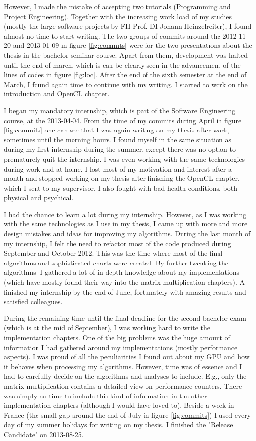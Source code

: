 However, I made the mistake of accepting two tutorials (Programming and Project Engineering). Together with the increasing work load of my studies (mostly the large software projects by FH-Prof. DI Johann Heinzelreiter), I found almost no time to start writing. The two groups of commits around the 2012-11-20 and 2013-01-09 in figure \ref{fig:commits} were for the two presentations about the thesis in the bachelor seminar course. Apart from them, development was halted until the end of march, which is can be clearly seen in the advancement of the lines of codes in figure \ref{fig:loc}. After the end of the sixth semester at the end of March, I found again time to continue with my writing. I started to work on the introduction and OpenCL chapter.

I began my mandatory internship, which is part of the Software Engineering course, at the 2013-04-04. From the time of my commits during April in figure \ref{fig:commits} one can see that I was again writing on my thesis after work, sometimes until the morning hours. I found myself in the same situation as during my first internship during the summer, except there was no option to prematurely quit the internship. I was even working with the same technologies during work and at home. I lost most of my motivation and interest after a month and stopped working on my thesis after finishing the OpenCL chapter, which I sent to my supervisor. I also fought with bad health conditions, both physical and psychical.

I had the chance to learn a lot during my internship. However, as I was working with the same technologies as I use in my thesis, I came up with more and more design mistakes and ideas for improving my algorithms. During the last month of my internship, I felt the need to refactor most of the code produced during September and October 2012. This was the time where most of the final algorithms and sophisticated charts were created. By further tweaking the algorithms, I gathered a lot of in-depth knowledge about my implementations (which have mostly found their way into the matrix multiplication chapters). A finished my internship by the end of June, fortunately with amazing results and satisfied colleagues.

During the remaining time until the final deadline for the second bachelor exam (which is at the mid of September), I was working hard to write the implementation chapters. One of the big problems was the huge amount of information I had gathered around my implementations (mostly performance aspects). I was proud of all the peculiarities I found out about my GPU and how it behaves when processing my algorithms. However, time was of essence and I had to carefully decide on the algorithms and analyses to include. E.g., only the matrix multiplication contains a detailed view on performance counters. There was simply no time to include this kind of information in the other implementation chapters (although I would have loved to). Beside a week in France (the small gap around the end of July in figure \ref{fig:commits}) I used every day of my summer holidays for writing on my thesis. I finished the "Release Candidate" on 2013-08-25.

